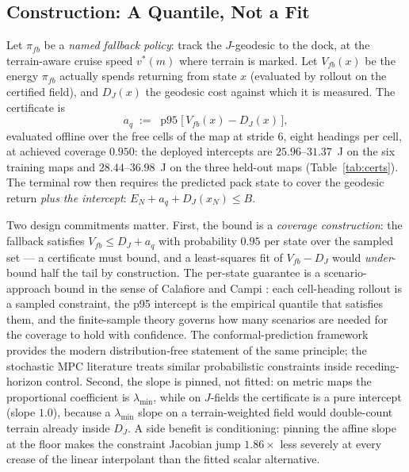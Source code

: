 \documentclass[preprint,12pt]{elsarticle}
\begin{document}
\subsection{Construction: A Quantile, Not a Fit}
Let $\pi_{fb}$ be a \emph{named fallback policy}: track the
$J$-geodesic to the dock, at the terrain-aware cruise speed
$v^{*}(m)$ where terrain is marked. Let $V_{fb}(x)$ be the energy
$\pi_{fb}$ actually spends returning from state $x$ (evaluated by
rollout on the certified field), and $D_J(x)$ the geodesic cost
against which it is measured. The certificate is
\begin{equation}
a_q \;:=\; \operatorname{p95}\big[\, V_{fb}(x) - D_J(x) \,\big],
\label{eq:aq}
\end{equation}
evaluated offline over the free cells of the map at stride 6, eight
headings per cell, at achieved coverage $0.950$: the deployed
intercepts are $25.96$--$31.37$~J on the six training maps and
$28.44$--$36.98$~J on the three held-out maps
(Table~\ref{tab:certs}). The terminal row then requires the predicted
pack state to cover the geodesic return \emph{plus the intercept}:
$E_N + a_q + D_J(x_N) \le B$.

Two design commitments matter. First, the bound is a \emph{coverage
construction}: the fallback satisfies $V_{fb} \le D_J + a_q$ with
probability $0.95$ per state over the sampled set --- a certificate
must bound, and a least-squares fit of $V_{fb} - D_J$ would
\emph{under}-bound half the tail by construction. The per-state
guarantee is a scenario-approach bound in the sense of Calafiore
and Campi \cite{calafiore2006scenario}: each cell-heading
rollout is a sampled constraint, the p95 intercept is the
empirical quantile that satisfies them, and the finite-sample
theory \cite{schildbach2014scenario} governs how many scenarios
are needed for the coverage to hold with confidence. The
conformal-prediction framework \cite{lindemann2023safe}
provides the modern distribution-free statement of the same
principle; the stochastic MPC literature
\cite{mesbah2016stochastic, blackmore2011chance} treats similar
probabilistic constraints inside receding-horizon control.
Second, the slope is
pinned, not fitted: on metric maps the proportional coefficient is
$\lambda_{\min}$, while on $J$-fields the certificate is a pure
intercept (slope $1.0$), because a $\lambda_{\min}$ slope on a
terrain-weighted field would double-count terrain already inside
$D_J$. A side benefit is conditioning: pinning the affine slope at
the floor makes the constraint Jacobian jump $1.86\times$ less
severely at every crease of the linear interpolant than the fitted
scalar alternative.
\end{document}
